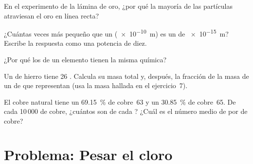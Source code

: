 \begin{exercise}[$\star\star$]\label{exo:g9:inside-the-atom:8}
En el experimento de la lámina de oro, ¿por qué la mayoría de las
partículas atraviesan el oro en línea recta?
\end{exercise}

\begin{exercise}[$\star\star$]\label{exo:g9:inside-the-atom:9}
¿Cuántas veces más pequeño que un  (\qty{e-10}{m}) es un  de
\qty{e-15}{m}? Escribe la respuesta como una potencia de diez.
\end{exercise}

\begin{exercise}[$\star\star$]\label{exo:g9:inside-the-atom:10}
¿Por qué los  de un elemento tienen la misma química?
\end{exercise}

\begin{exercise}[$\star\star\star$]\label{exo:g9:inside-the-atom:11}
Un  de hierro tiene 26 . Calcula su masa total y, después,
la fracción de la masa de un  de  que representan
(usa la masa hallada en el ejercicio~7).
\end{exercise}

\begin{exercise}[$\star\star\star$]\label{exo:g9:inside-the-atom:12}
El cobre natural tiene un \qty{69.15}{\percent} de cobre~63 y un
\qty{30.85}{\percent} de cobre~65. De cada 10\,000  de cobre,
¿cuántos son de cada ? ¿Cuál es el número medio de  por
 de cobre?
\end{exercise}

\clearpage %
\section{Problema: Pesar el cloro}

